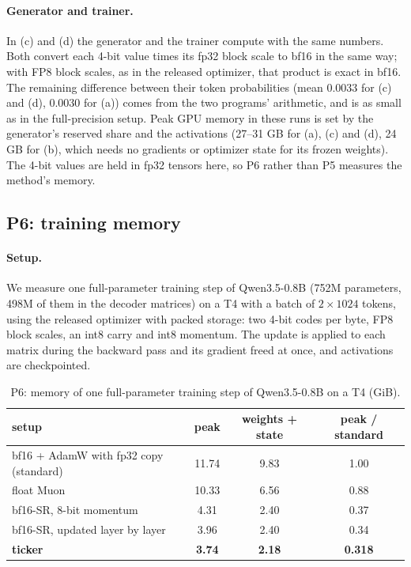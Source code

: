\documentclass[11pt]{article}
\begin{document}
\paragraph{Generator and trainer.} In (c) and (d) the generator and the trainer compute with the same numbers. Both
convert each 4-bit value times its fp32 block scale to bf16 in the same way; with FP8 block scales, as in the released
optimizer, that product is exact in bf16. The remaining difference between their token probabilities (mean 0.0033 for
(c) and (d), 0.0030 for (a)) comes from the two programs' arithmetic, and is as small as in the full-precision setup.
Peak GPU memory in these runs is set by the generator's reserved share and the activations (27--31 GB for (a), (c) and
(d), 24 GB for (b), which needs no gradients or optimizer state for its frozen weights). The 4-bit values are held in
fp32 tensors here, so P6 rather than P5 measures the method's memory.

\subsection{P6: training memory}\label{sec:p6}
\paragraph{Setup.} We measure one full-parameter training step of Qwen3.5-0.8B (752M parameters, 498M of them in the
decoder matrices) on a T4 with a batch of $2\times1024$ tokens, using the released optimizer with packed storage: two
4-bit codes per byte, FP8 block scales, an int8 carry and int8 momentum. The update is applied to each matrix during
the backward pass and its gradient freed at once, and activations are checkpointed.

\begin{table}[t]
\centering
\caption{P6: memory of one full-parameter training step of Qwen3.5-0.8B on a T4 (GiB).}
\label{tab:p6}
\small
\begin{tabular}{lccc}
\toprule
setup & peak & weights + state & peak / standard \\
\midrule
bf16 + AdamW with fp32 copy (standard) & 11.74 & 9.83 & 1.00 \\
float Muon & 10.33 & 6.56 & 0.88 \\
bf16-SR, 8-bit momentum & 4.31 & 2.40 & 0.37 \\
bf16-SR, updated layer by layer & 3.96 & 2.40 & 0.34 \\
\textbf{ticker} & \textbf{3.74} & \textbf{2.18} & \textbf{0.318} \\
\bottomrule
\end{tabular}
\end{table}
\end{document}
